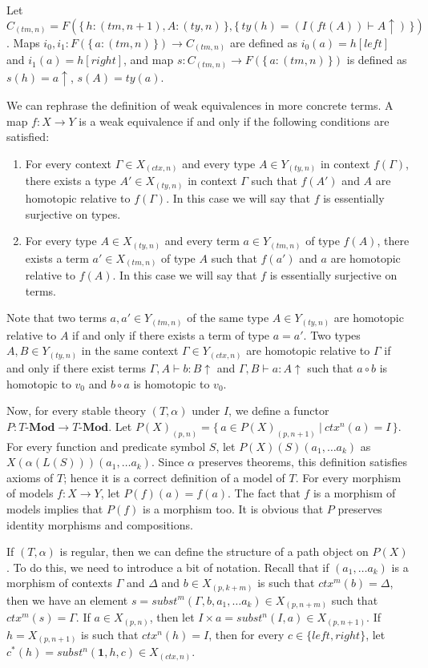 \documentclass[reqno]{amsart}
\theoremstyle{definition}
\theoremstyle{remark}
\newcommand{\cat}[1]{\mathbf{#1}}
\newcommand{\Mod}[1]{#1\text{-}\cat{Mod}}
\newcommand{\emptyCtx}{\mathbf{1}}
\newcommand{\cyli}{i}
\numberwithin{figure}{section}
\begin{document}
Let $C_{(tm,n)} = F(\{\,h : (tm,n+1), A : (ty,n)\,\}, \{\,ty(h) = (I(ft(A)) \vdash A\!\!\uparrow)\,\})$.
Maps $\cyli_0, \cyli_1 : F(\{\,a : (tm,n)\,\}) \to C_{(tm,n)}$ are defined as $\cyli_0(a) = h[left]$ and $\cyli_1(a) = h[right]$,
and map $s : C_{(tm,n)} \to F(\{\,a : (tm,n)\,\})$ is defined as $s(h) = a\!\!\uparrow$, $s(A) = ty(a)$.

We can rephrase the definition of weak equivalences in more concrete terms.
A map $f : X \to Y$ is a weak equivalence if and only if the following conditions are satisfied:
\begin{enumerate}
\item For every context $\Gamma \in X_{(ctx,n)}$ and every type $A \in Y_{(ty,n)}$ in context $f(\Gamma)$,
there exists a type $A' \in X_{(ty,n)}$ in context $\Gamma$ such that $f(A')$ and $A$ are homotopic relative to $f(\Gamma)$.
In this case we will say that $f$ is essentially surjective on types.
\item For every type $A \in X_{(ty,n)}$ and every term $a \in Y_{(tm,n)}$ of type $f(A)$,
there exists a term $a' \in X_{(tm,n)}$ of type $A$ such that $f(a')$ and $a$ are homotopic relative to $f(A)$.
In this case we will say that $f$ is essentially surjective on terms.
\end{enumerate}

Note that two terms $a,a' \in Y_{(tm,n)}$ of the same type $A \in Y_{(ty,n)}$ are homotopic relative to $A$
if and only if there exists a term of type $a = a'$.
Two types $A,B \in Y_{(ty,n)}$ in the same context $\Gamma \in Y_{(ctx,n)}$ are homotopic relative to $\Gamma$
if and only if there exist terms $\Gamma, A \vdash b : B\!\!\uparrow$ and $\Gamma, B \vdash a : A\!\!\uparrow$
such that $a \circ b$ is homotopic to $v_0$ and $b \circ a$ is homotopic to $v_0$.

Now, for every stable theory $(T,\alpha)$ under $I$, we define a functor $P : \Mod{T} \to \Mod{T}$.
Let $P(X)_{(p,n)} = \{\,a \in P(X)_{(p,n+1)}\ |\ ctx^n(a) = I\,\}$.
For every function and predicate symbol $S$, let $P(X)(S)(a_1, \ldots a_k)$ as $X(\alpha(L(S)))(a_1, \ldots a_k)$.
Since $\alpha$ preserves theorems, this definition satisfies axioms of $T$; hence it is a correct definition of a model of $T$.
For every morphism of models $f : X \to Y$, let $P(f)(a) = f(a)$.
The fact that $f$ is a morphism of models implies that $P(f)$ is a morphism too.
It is obvious that $P$ preserves identity morphisms and compositions.

If $(T,\alpha)$ is regular, then we can define the structure of a path object on $P(X)$.
To do this, we need to introduce a bit of notation.
Recall that if $(a_1, \ldots a_k)$ is a morphism of contexts $\Gamma$ and $\Delta$ and $b \in X_{(p,k+m)}$ is such that $ctx^m(b) = \Delta$,
then we have an element $s = subst^m(\Gamma, b, a_1, \ldots a_k) \in X_{(p,n+m)}$ such that $ctx^m(s) = \Gamma$.
If $a \in X_{(p,n)}$, then let $I \times a = subst^n(I, a) \in X_{(p,n+1)}$.
If $h = X_{(p,n+1)}$ is such that $ctx^n(h) = I$, then for every $c \in \{ left, right \}$, let $c^*(h) = subst^n(\emptyCtx, h, c) \in X_{(ctx,n)}$.
\end{document}
